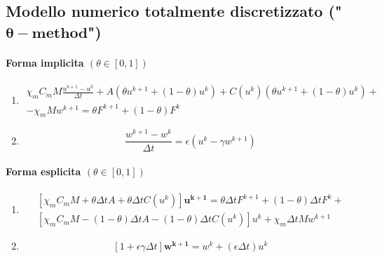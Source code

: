 \documentclass[a4paper]{article}
\theoremstyle{definition}
\begin{document}
\subsection{Modello numerico totalmente discretizzato ("$\bm{\theta-method}$")}
\vspace{5mm}
\paragraph{Forma implicita $(\theta \in [0,1])$}
\begin{enumerate}
	\item
	\begin{equation}
	\begin{gathered}
	\chi_mC_m M \frac{u^{k+1}-u^k}{\Delta t} +  A \left(\theta u^{k+1} + (1-\theta)u^k \right) + C(u^k)\left(\theta u^{k+1} + (1-\theta)u^k \right) +
	\\ -\chi_mMw^{k+1}=\theta F^{k+1} + (1-\theta)F^k
	\end{gathered}
	\end{equation}
	\item
	\begin{equation}
	\frac{w^{k+1}- w^{k}}{\Delta t} = \epsilon(u^k-\gamma w^{k+1})
	\end{equation}
\end{enumerate}
\vspace{3mm}
\paragraph{Forma esplicita $(\theta \in [0,1])$}
\begin{enumerate}
	\item
	\begin{equation}
	\begin{gathered}
	\left[\chi_mC_mM+\theta \Delta t A + \theta \Delta t C(u^k) \right] \bm{u^{k+1}} = \theta\Delta t F^{k+1} + (1-\theta)\Delta tF^k +
	\\
	\left[\chi_mC_mM- (1-\theta)\Delta t A - (1-\theta)\Delta t C(u^k)\right] u^k +\chi_m\Delta t Mw^{k+1} 
	\end{gathered}
	\end{equation}
	\item
	\begin{equation}
	\left[1+ \epsilon \gamma \Delta t\right] \bm{w^{k+1}} = w^k + (\epsilon \Delta t) u^k
	\end{equation}
\end{enumerate}
\end{document}
